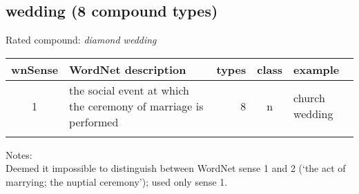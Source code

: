 \pagebreak[4]
\subsection{wedding  (8 compound types)}
Rated compound: \emph{diamond wedding}

\vspace*{1ex}

\noindent
\begin{longtable}{c>{\raggedright\arraybackslash}p{5cm}rc>{\raggedright\arraybackslash}p{2cm}}\lsptoprule
{\small wnSense}&WordNet description&types&class&example\\\midrule
1&the social event at which the ceremony of marriage is performed&8&n&church wedding\\\lspbottomrule 
\end{longtable}

\noindent
Notes:\\
Deemed it impossible to distinguish between WordNet sense 1 and 2 (`the act of marrying; the nuptial ceremony'); used only sense 1.



